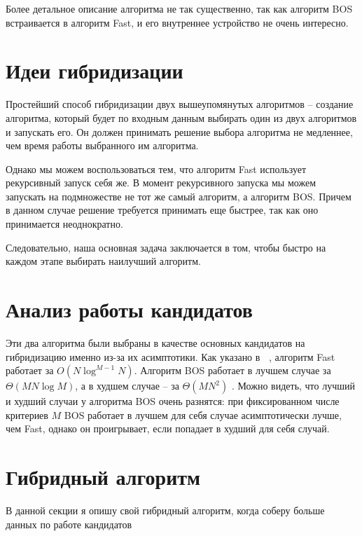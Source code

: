Более детальное описание алгоритма не так существенно, так как алгоритм BOS встраивается в алгоритм Fast, и его внутреннее устройство не очень интересно. 

\section{Идеи гибридизации}
Простейший способ гибридизации двух вышеупомянутых алгоритмов -- создание алгоритма, который будет по входным данным выбирать один из двух алгоритмов и запускать его. Он должен принимать решение выбора алгоритма не медленнее, чем время работы выбранного им алгоритма.

Однако мы можем воспользоваться тем, что алгоритм Fast использует рекурсивный запуск себя же. В момент рекурсивного запуска мы можем запускать на подмножестве не тот же самый алгоритм, а алгоритм BOS. Причем в данном случае решение требуется принимать еще быстрее, так как оно принимается неоднократно.

Следовательно, наша основная задача заключается в том, чтобы быстро на каждом этапе выбирать наилучший алгоритм.  


\section{Анализ работы кандидатов}

Эти два алгоритма были выбраны в качестве основных кандидатов на гибридизацию именно из-за их асимптотики. Как указано в \cite{Buzdalov}, алгоритм Fast работает за $O(N\log^{M - 1}N)$. Алгоритм BOS работает в лучшем случае за $\Theta(MN\log{M})$, а в худшем случае -- за $\Theta(MN^2)$ \cite{BOS}. Можно видеть, что лучший и худший случаи у алгоритма BOS очень разнятся: при фиксированном числе критериев  $M$ BOS работает в лучшем для себя случае асимптотически лучше, чем Fast, однако он проигрывает, если попадает в худший для себя случай.

\section{Гибридный алгоритм}

В данной секции я опишу свой гибридный алгоритм, когда соберу больше данных по работе кандидатов